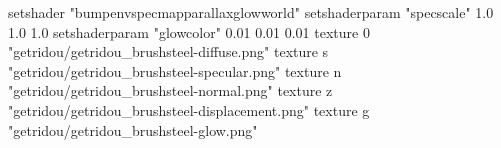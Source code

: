 setshader "bumpenvspecmapparallaxglowworld"
setshaderparam "specscale" 1.0 1.0 1.0
setshaderparam "glowcolor" 0.01 0.01 0.01
texture 0 "getridou/getridou_brushsteel-diffuse.png"
texture s "getridou/getridou_brushsteel-specular.png"
texture n "getridou/getridou_brushsteel-normal.png"
texture z "getridou/getridou_brushsteel-displacement.png"
texture g "getridou/getridou_brushsteel-glow.png"
